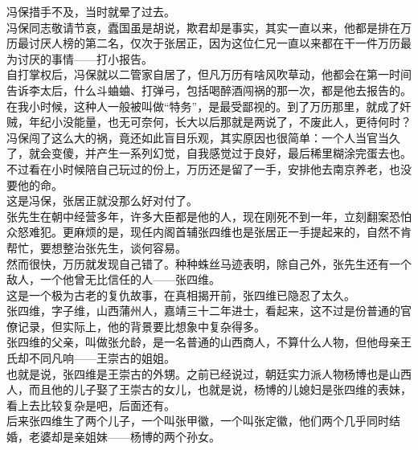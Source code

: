 \begin{multicols}{\theparacolNo}
冯保措手不及，当时就晕了过去。\\

冯保同志敬请节哀，蠹国虽是胡说，欺君却是事实，其实一直以来，他都是排在万历最讨厌人榜的第二名，仅次于张居正，因为这位仁兄一直以来都在干一件万历最为讨厌的事情——打小报告。\\

自打掌权后，冯保就以二管家自居了，但凡万历有啥风吹草动，他都会在第一时间告诉李太后，什么斗蛐蛐、打弹弓，包括喝醉酒闯祸的那一次，都是他去报告的。\\

在我小时候，这种人一般被叫做“特务”，是最受鄙视的。到了万历那里，就成了奸贼，年纪小没能量，也无可奈何，长大以后那就是两说了，不废此人，更待何时？\\

冯保闯了这么大的祸，竟还如此盲目乐观，其实原因也很简单：一个人当官当久了，就会变傻，并产生一系列幻觉，自我感觉过于良好，最后稀里糊涂完蛋去也。\\

不过看在小时候陪自己玩过的份上，万历还是留了一手，安排他去南京养老，也没要他的命。\\

这是冯保，张居正就没那么好对付了。\\

张先生在朝中经营多年，许多大臣都是他的人，现在刚死不到一年，立刻翻案恐怕众怒难犯。更麻烦的是，现任内阁首辅张四维也是张居正一手提起来的，自然不肯帮忙，要想整治张先生，谈何容易。\\

然而很快，万历就发现自己错了。种种蛛丝马迹表明，除自己外，张先生还有一个敌人，一个他曾无比信任的人——张四维。\\

这是一个极为古老的复仇故事，在真相揭开前，张四维已隐忍了太久。\\

张四维，字子维，山西蒲州人，嘉靖三十二年进士，看起来，这不过是份普通的官僚记录，但实际上，他的背景要比想象中复杂得多。\\

张四维的父亲，叫做张允龄，是一名普通的山西商人，不算什么人物，但他母亲王氏却不同凡响——王崇古的姐姐。\\

也就是说，张四维是王崇古的外甥。之前已经说过，朝廷实力派人物杨博也是山西人，而且他的儿子娶了王崇古的女儿，也就是说，杨博的儿媳妇是张四维的表妹，看上去比较复杂是吧，后面还有。\\

后来张四维生了两个儿子，一个叫张甲徽，一个叫张定徽，他们两个几乎同时结婚，老婆却是亲姐妹——杨博的两个孙女。\\


\end{multicols}
